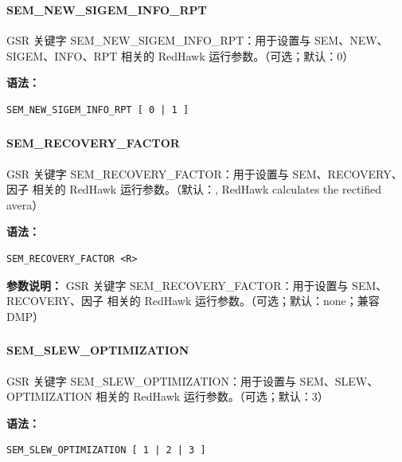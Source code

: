\subsubsection{}
\paragraph*{SEM_NEW_SIGEM_INFO_RPT}

GSR 关键字 SEM_NEW_SIGEM_INFO_RPT：用于设置与 SEM、NEW、SIGEM、INFO、RPT 相关的 RedHawk 运行参数。（可选；默认：0）

\textbf{语法：}
\begin{lstlisting}
SEM_NEW_SIGEM_INFO_RPT [ 0 | 1 ]
\end{lstlisting}

\subsubsection{}
\paragraph*{SEM_RECOVERY_FACTOR}

GSR 关键字 SEM_RECOVERY_FACTOR：用于设置与 SEM、RECOVERY、因子 相关的 RedHawk 运行参数。（默认：, RedHawk calculates the rectified avera）

\textbf{语法：}
\begin{lstlisting}
SEM_RECOVERY_FACTOR <R>
\end{lstlisting}

\textbf{参数说明：}
GSR 关键字 SEM\_RECOVERY\_FACTOR：用于设置与 SEM、RECOVERY、因子 相关的 RedHawk 运行参数。（可选；默认：none；兼容 DMP）

\subsubsection{}
\paragraph*{SEM_SLEW_OPTIMIZATION}

GSR 关键字 SEM_SLEW_OPTIMIZATION：用于设置与 SEM、SLEW、OPTIMIZATION 相关的 RedHawk 运行参数。（可选；默认：3）

\textbf{语法：}
\begin{lstlisting}
SEM_SLEW_OPTIMIZATION [ 1 | 2 | 3 ]
\end{lstlisting}

